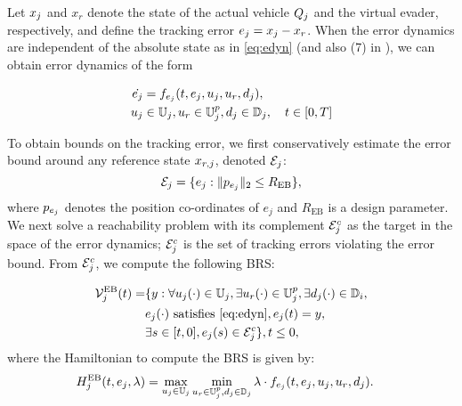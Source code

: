 
Let $x_j$ and $x_r$ denote the state of the actual vehicle $Q_j$ and the virtual evader, respectively, and define the tracking error $e_j=x_j-x_r$. When the error dynamics are independent of the absolute state as in \eqref{eq:edyn} (and also (7) in \cite{Mitchell05}), we can obtain error dynamics of the form

\begin{equation}
\label{eq:edyn} %
\begin{aligned}
\dot{e_j} &= \fdyn_{e_j}(t, e_j, \ctrl_j, \ctrl_r,\dstb_j), \\
\ctrl_j &\in \cfset_j, \ctrl_r \in \cfset^\pos_j, \dstb_j \in \dfset_j, \quad t \in [0, T]
\end{aligned}
\end{equation}

To obtain bounds on the tracking error, we first conservatively estimate the error bound around any reference state $x_{r,j}$, denoted $\mathcal{E}_j$:
\begin{equation}
\mathcal{E}_j = \{e_j: \|p_{e_j}\|_2 \le R_{\text{EB}} \}, 
\end{equation}
where $p_{e_j}$ denotes the position co-ordinates of $e_j$ and $R_{\text{EB}}$ is a design parameter. We next solve a reachability problem with its complement $\mathcal{E}_j^c$ as the target in the space of the error dynamics; $\mathcal{E}_j^c$ is the set of tracking errors violating the error bound. From $\mathcal{E}_j^c$, we compute the following BRS:

\begin{equation} \label{eqn:errBound}
\begin{aligned}
\brs^{\text{EB}}_{j}(t) = & \{y: \forall \ctrl_j(\cdot) \in \cfset_j, \exists \ctrl_r(\cdot) \in \cfset^\pos_j, \exists \dstb_j(\cdot) \in \dfset_i, \\
& e_j(\cdot) \text{ satisfies \eqref{eq:edyn}}, e_j(t) = y, \\
& \exists s \in [t, 0], e_j(s) \in \errorbound_j^c\}, t \leq 0, 
\end{aligned}
\end{equation}
where the Hamiltonian to compute the BRS is given by:
\begin{equation}
\begin{aligned}
H^{\text{EB}}_{j}(t, e_j, \lambda) &= \max_{u_j \in \mathbb{U}_j} \min_{u_r \in \mathbb{U}^p_j, d_j \in \mathbb{D}_j} \lambda \cdot f_{e_j}(t, e_j, u_j, u_r, d_j).
\end{aligned}
\end{equation}

